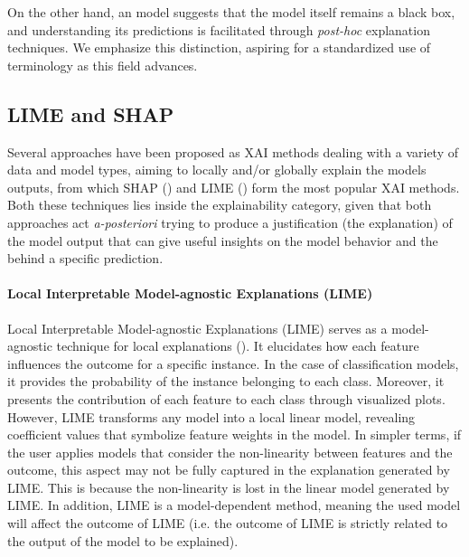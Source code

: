 \documentclass[binding=0.6cm]{sapthesis}
\newcommand{\mycite}[1]{(\cite{#1})}
\begin{document}
On the other hand, an  model suggests that the model itself remains a black box, and understanding its predictions is facilitated through \textit{post-hoc} explanation techniques. We emphasize this distinction, aspiring for a standardized use of terminology as this field advances.


\subsection{LIME and SHAP}
\label{sec:bg.xai.shap-lime}
Several approaches have been proposed as XAI methods dealing with a variety of data and model types, aiming to locally and/or globally explain the models outputs, from which SHAP \mycite{lundberg2017-shap} and LIME \mycite{ribeiro2016-lime} form the most popular XAI methods. Both these techniques lies inside the explainability category, given that both approaches act \textit{a-posteriori} trying to produce a justification (the explanation) of the model output that can give useful insights on the model behavior and the  behind a specific prediction.

\paragraph{Local Interpretable Model-agnostic Explanations (LIME)}
\label{sec:bg.xai.lime}
Local Interpretable Model-agnostic Explanations (LIME) serves as a model-agnostic technique for local explanations \mycite{ribeiro2016-lime}. It elucidates how each feature influences the outcome for a specific instance. In the case of classification models, it provides the probability of the instance belonging to each class. Moreover, it presents the contribution of each feature to each class through visualized plots. However, LIME transforms any model into a local linear model, revealing coefficient values that symbolize feature weights in the model. In simpler terms, if the user applies models that consider the non-linearity between features and the outcome, this aspect may not be fully captured in the explanation generated by LIME. This is because the non-linearity is lost in the linear model generated by LIME. In addition, LIME is a model-dependent method, meaning the used model will affect the outcome of LIME (i.e. the outcome of LIME is strictly related to the output of the model to be explained).
\end{document}
